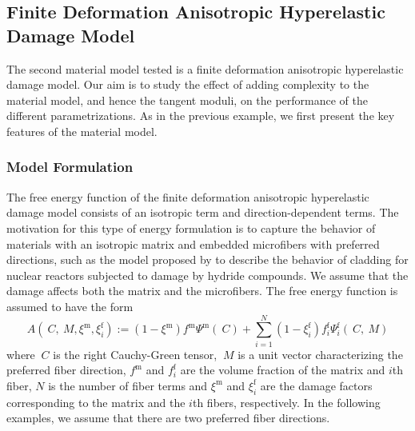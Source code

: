 \documentclass[12pt]{article}
\newcommand{\mtrx}{{\text{m}}}
\newcommand{\fiber}{{\text{f}}}
\numberwithin{equation}{section}
\begin{document}
\subsection{Finite Deformation Anisotropic Hyperelastic Damage Model}
\label{subsec:anisotropic}

The second material model tested is a finite deformation anisotropic
hyperelastic damage model. Our aim is to study the effect of adding
complexity to the material model, and hence the tangent moduli, on the
performance of the different parametrizations. As in the previous
example, we first present the key features of the material model.

\subsubsection{Model Formulation}

The free energy function of the finite deformation anisotropic
hyperelastic damage model consists of an isotropic term and
direction-dependent terms. The motivation for this type of energy
formulation is to capture the behavior of materials with an isotropic
matrix and embedded microfibers with preferred directions, such as the
model proposed by \citet{Chen.etal:2014} to describe the behavior of
cladding for nuclear reactors subjected to damage by hydride
compounds. We assume that the damage affects both the matrix and the
microfibers. The free energy function is assumed to have the form
\begin{equation}\label{eq:aniso-energy}
  A(~C, ~M, \xi^\mtrx, \xi^\fiber_i)
  :=
  (1-\xi^\mtrx) f^\mtrx \Psi^\mtrx(~C)
  + \sum_{i=1}^{N} (1-\xi^\fiber_i) f^\fiber_i \Psi^\fiber_i(~C, ~M)
\end{equation}
where $~C$ is the right Cauchy-Green tensor, $~M$ is a unit vector
characterizing the preferred fiber direction, $f^\mtrx$ and
$f^\fiber_i$ are the volume fraction of the matrix and $i$th fiber,
$N$ is the number of fiber terms and $\xi^\mtrx$ and $\xi^\fiber_i$
are the damage factors corresponding to the matrix and the $i$th
fibers, respectively. In the following examples, we assume that there
are two preferred fiber directions.
\end{document}

